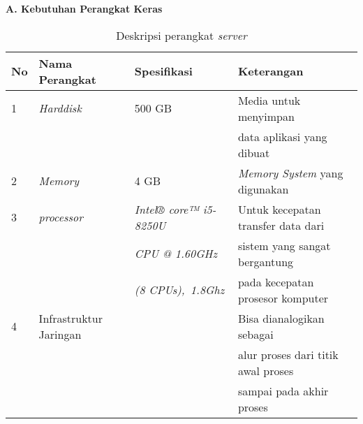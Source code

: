 \textbf{A.	Kebutuhan Perangkat Keras}

\begin{table}[!htbp]
\captionsetup{singlelinecheck=off}
\caption{Deskripsi perangkat \textit{server}}
\label{perangkatserver}
\begin{tabular}{|l|l|l|l|}
\hline
No & Nama Perangkat & Spesifikasi & Keterangan \\
\hline

1 &  \textit{Harddisk} & 500 GB  & Media untuk menyimpan \\
 & & & data aplikasi yang dibuat  \\
\hline

2 &  \textit{Memory} & 4 GB & \textit{Memory System} yang digunakan  \\
\hline

3 &  \textit{processor} & \textit{Intel® core™ i5-8250U  } &  Untuk kecepatan transfer data dari \\

 & & \textit{CPU @ 1.60GHz} &  sistem yang sangat bergantung \\
 
 & &\textit{(8 CPUs),~1.8Ghz} & pada kecepatan prosesor komputer \\
\hline

4 &  Infrastruktur Jaringan &    & Bisa dianalogikan sebagai \\     & & &  alur proses dari titik awal proses \\
& & & sampai pada akhir proses  \\

\hline
\end{tabular}
\end{table}


